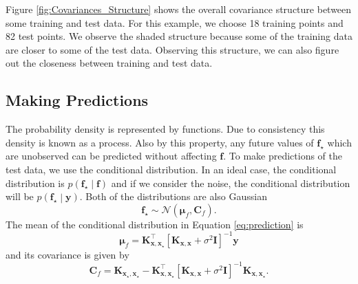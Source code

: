 Figure \ref{fig:Covariances_Structure} shows the overall covariance structure between some training and test data. For this example, we choose 18 training points and 82 test points. We observe the shaded structure because some of the training data are closer to some of the test data. Observing this structure, we can also figure out the closeness between training and test data. 


\subsection{Making Predictions}
The probability density is represented by functions. Due to consistency this density is known as a process. Also by this property, any future values of $\mathbf{f_\star}$ which are unobserved can be predicted without affecting $\mathbf{f}$. To make predictions of the test data, we use the conditional distribution. In an ideal case, the conditional distribution is $p\left(\mathbf{f_\star}\middle| \mathbf{f} \right)$ and if we consider the noise, the conditional distribution will be $ p\left( \mathbf{f_\star} \middle| \mathbf{y} \right) $. Both of the distributions are also Gaussian
\begin{equation} \label{eq:prediction}
\mathbf{f_\star}  \sim \mathcal{N} \left( \boldsymbol{\mu}_f, \mathbf{C}_f \right).
\end{equation}
The mean of the conditional distribution in Equation \ref{eq:prediction} is
\begin{equation} \label{eq:prediction_mean}
\boldsymbol{\mu}_f = \mathbf{K_{x,x_\star}^\top} \left[ \mathbf{K_{x,x}}+ \sigma^2\mathbf{I} \right]^{-1} \mathbf{y}
\end{equation}
and its covariance is given by
\begin{equation} \label{eq:prediction_cov}
\mathbf{C}_f = \mathbf{K_{x_\star,x_\star}} -
\mathbf{K_{x,x_\star}^\top} \left[ \mathbf{K_{x,x}}+ \sigma^2\mathbf{I} \right]^{-1} \mathbf{K_{x,x_\star}}.
\end{equation}

